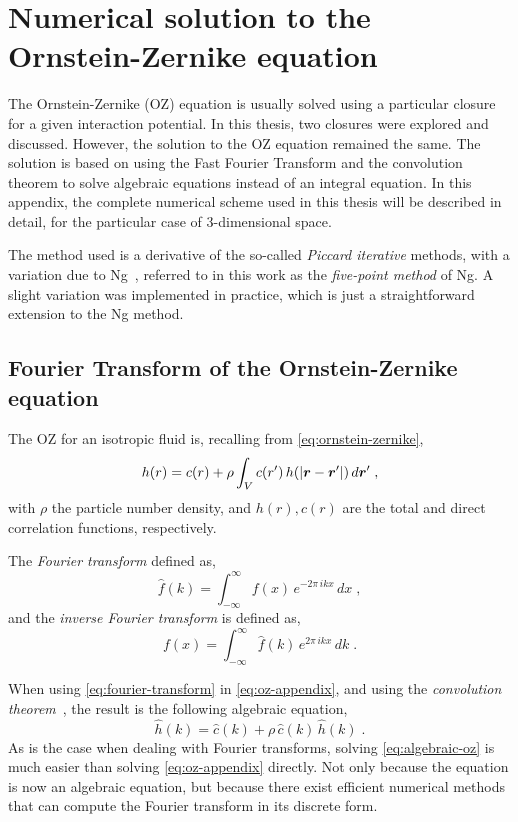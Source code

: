 \chapter{Numerical solution to the Ornstein-Zernike equation}
\label{AppendixB}

The Ornstein-Zernike (OZ) equation is usually solved using a particular closure for a given 
interaction potential. In this thesis, two closures were explored and discussed. However, 
the solution to the OZ equation remained the same. The solution is based on using the Fast 
Fourier Transform and the convolution theorem to solve algebraic equations instead of an 
integral equation. In this appendix, the complete numerical scheme used in this thesis will 
be described in detail, for the particular case of \(3\)-dimensional space.

The method used is a derivative of the so-called \emph{Piccard iterative} methods, with a 
variation due to Ng~\cite{ngHypernettedChainSolutions1974}, referred to in this work as the 
\emph{five-point method} of Ng. A slight variation was implemented in practice, which is 
just a straightforward extension to the Ng method.

\section{Fourier Transform of the Ornstein-Zernike equation}
The OZ for an isotropic fluid is, recalling from \autoref{eq:ornstein-zernike},
\begin{equation}
    h(r) = c(r) + \rho \int_{V} c(r') \, h(\lvert \bm{r} - \bm{r}' \rvert) \, d \bm{r}'
    \; ,
    \label{eq:oz-appendix}
\end{equation}
with \(\rho\) the particle number density, and \(h(r), c(r)\) are the total and direct correlation functions, respectively.

The \emph{Fourier transform} defined as,
\begin{equation}
    \hat{f}(k) = \int_{- \infty}^{\infty} f(x) \, e^{-2 \pi \, i k x} \, dx
    \; ,
    \label{eq:fourier-transform}
\end{equation}
and the \emph{inverse Fourier transform} is defined as,
\begin{equation}
    f(x) = \int_{- \infty}^{\infty} \hat{f}(k) \, e^{2 \pi \, i k x} \, dk
    \; .
    \label{eq:inv-fourier-transform}
\end{equation}

When using \autoref{eq:fourier-transform} in \autoref{eq:oz-appendix}, and using the 
\emph{convolution theorem}~\cite{kornerFourierAnalysis1989}, the result is the following 
algebraic equation,
\begin{equation}
    \hat{h}(k) = \hat{c}(k) + \rho \, \hat{c}(k) \, \hat{h}(k)
    \; .
    \label{eq:algebraic-oz}
\end{equation}
As is the case when dealing with Fourier transforms, solving \autoref{eq:algebraic-oz} is 
much easier than solving \autoref{eq:oz-appendix} directly. Not only because the equation 
is now an algebraic equation, but because there exist efficient numerical methods that can 
compute the Fourier transform in its discrete form.